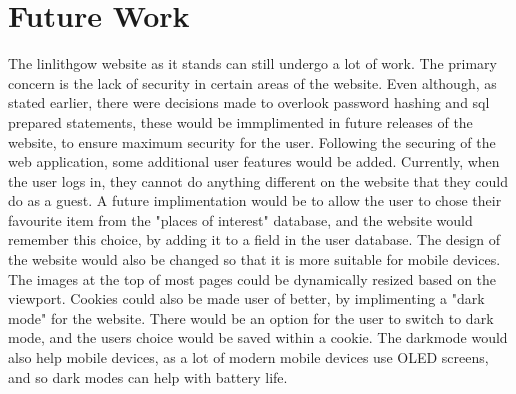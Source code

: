 \documentclass[12pt,a4paper]{article}
\begin{document}
	\section{Future Work}
	The linlithgow website as it stands can still undergo a lot of work. The primary concern is the lack of security in certain areas of the website. Even although, as stated earlier, there were decisions made to overlook password hashing and sql prepared statements, these would be immplimented in future releases of the website, to ensure maximum security for the user. Following the securing of the web application, some additional user features would be added. Currently, when the user logs in, they cannot do anything different on the website that they could do as a guest. A future implimentation would be to allow the user to chose their favourite item from the "places of interest" database, and the website would remember this choice, by adding it to a field in the user database. The design of the website would also be changed so that it is more suitable for mobile devices. The images at the top of most pages could be dynamically resized based on the viewport. Cookies could also be made user of better, by implimenting a "dark mode" for the website. There would be an option for the user to switch to dark mode, and the users choice would be saved within a cookie. The darkmode would also help mobile devices, as a lot of modern mobile devices use OLED screens, and so dark modes can help with battery life.

	\clearpage






\end{document}

